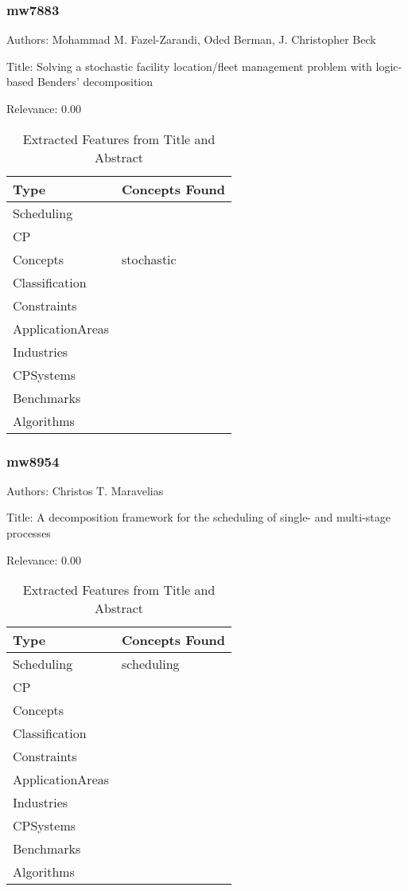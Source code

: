 \subsubsection{mw7883}
\label{mw:mw7883}

Authors: Mohammad M. Fazel-Zarandi, Oded Berman, J. Christopher Beck

Title: Solving a stochastic facility location/fleet management problem with logic-based Benders' decomposition

Relevance:  0.00

{\scriptsize
\begin{longtable}{p{2cm}p{20cm}}
\caption{Extracted Features from Title and Abstract}\\ \toprule
Type & Concepts Found\\ \midrule
\endhead
\bottomrule
\endfoot
Scheduling & \\ 
CP & \\ 
Concepts & stochastic\\ 
Classification & \\ 
Constraints & \\ 
ApplicationAreas & \\ 
Industries & \\ 
CPSystems & \\ 
Benchmarks & \\ 
Algorithms & \\ 
\end{longtable}
}



\subsubsection{mw8954}
\label{mw:mw8954}

Authors: Christos T. Maravelias

Title: A decomposition framework for the scheduling of single- and multi-stage processes

Relevance:  0.00

{\scriptsize
\begin{longtable}{p{2cm}p{20cm}}
\caption{Extracted Features from Title and Abstract}\\ \toprule
Type & Concepts Found\\ \midrule
\endhead
\bottomrule
\endfoot
Scheduling & scheduling\\ 
CP & \\ 
Concepts & \\ 
Classification & \\ 
Constraints & \\ 
ApplicationAreas & \\ 
Industries & \\ 
CPSystems & \\ 
Benchmarks & \\ 
Algorithms & \\ 
\end{longtable}
}



